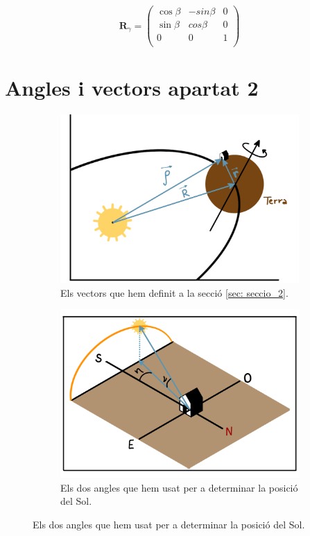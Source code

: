 \documentclass[11pt]{article}
\begin{document}
\begin{equation}
    \mathbf{R}_{\gamma}=
    \begin{pmatrix}
       \cos\beta& -sin\beta& 0 \\
       \sin\beta & cos\beta &0\\
      0 & 0 & 1  \\
    \end{pmatrix}
\end{equation}  


\section{Angles i vectors apartat 2}
\begin{figure}[hbt]
    \centering
    \begin{subfigure}{0.5\textwidth}
        \centering
        \includegraphics[width=\textwidth]{vectors.PNG}
        \caption{Els vectors que hem definit a la secció \ref{sec: seccio_2}.}
        \label{fig: sist_vectors}
    \end{subfigure}%
    \hspace{0.000001\textwidth}%
    \begin{subfigure}{0.5\textwidth}
        \centering
        \includegraphics[width=\textwidth]{ang_sol.PNG}
        \caption{Els dos angles que hem usat per a determinar la posició del Sol.}
        \label{fig: sist_sol}
    \end{subfigure}
\end{figure}
\end{document}
